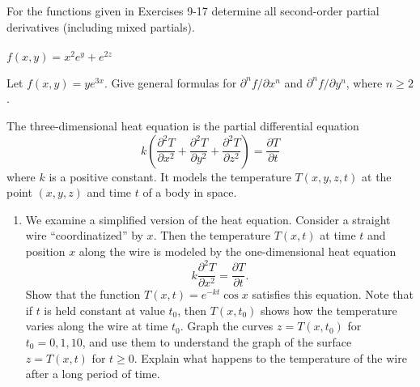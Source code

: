 \documentclass[12pt,letterpaper]{hmcpset}
\newcommand{\pn}[1]{\left( #1 \right)}
\begin{document}
\begin{problem}[2.4.17]
    For the functions given in Exercises 9-17 determine all
    second-order partial derivatives (including mixed partials).\\\\
    $f(x,y)=x^2e^y+e^{2z}$
\end{problem}
\begin{solution}
    \vfill
\end{solution}
\newpage

\begin{problem}[2.4.23]
    Let $f(x,y)=ye^{3x}$. Give general formulas for $\partial^n f/\partial x^n$
    and $\partial^n f/\partial y^n$, where $n\geq 2$.
\end{problem}
\begin{solution}
    \vfill
\end{solution}
\newpage

\begin{problem}[2.2.29a]
    The three-dimensional heat equation is the partial differential equation
    $$k\pn{\frac{\partial^2 T}{\partial x^2}+\frac{\partial^2 T}{\partial y^2}
    +\frac{\partial^2 T}{\partial z^2}}=\frac{\partial T}{\partial t}$$
    where $k$ is a positive constant. It models the temperature
    $T(x,y,z,t)$ at the point $(x,y,z)$ and time $t$ of a body in space.
    \begin{enumerate}
        \item We examine a simplified version of the heat
            equation. Consider a straight wire ``coordinatized'' by $x$. Then
            the temperature $T(x,t)$ at time $t$ and position $x$ along
            the wire is modeled by the one-dimensional heat equation
            $$k\frac{\partial^2 T}{\partial x^2}
            =\frac{\partial T}{\partial t}.$$
            Show that the function $T(x,t)=e^{-kt}\cos x$ satisfies this
            equation. Note that if $t$ is held constant at value $t_0$, then
            $T(x,t_0)$ shows how the temperature varies along the wire at time
            $t_0$. Graph the curves $z=T(x,t_0)$ for $t_0=0,1,10$, and use them to
            understand the graph of the surface $z=T(x,t)$ for $t\geq0$. Explain
            what happens to the temperature of the wire after a long period of
            time.
    \end{enumerate}
\end{problem}
\begin{solution}
    \vfill
\end{solution}
\end{document}
